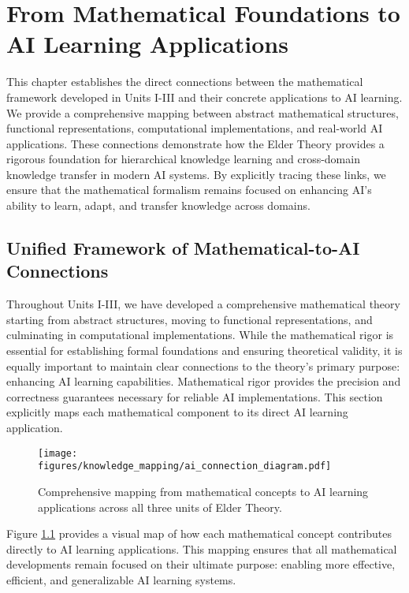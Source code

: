 \chapter{From Mathematical Foundations to AI Learning Applications}

\begin{tcolorbox}[colback=blue!5!white,colframe=blue!75!black,title=\textit{Chapter Summary}]
This chapter establishes the direct connections between the mathematical framework developed in Units I-III and their concrete applications to AI learning. We provide a comprehensive mapping between abstract mathematical structures, functional representations, computational implementations, and real-world AI applications. These connections demonstrate how the Elder Theory provides a rigorous foundation for hierarchical knowledge learning and cross-domain knowledge transfer in modern AI systems. By explicitly tracing these links, we ensure that the mathematical formalism remains focused on enhancing AI's ability to learn, adapt, and transfer knowledge across domains.
\end{tcolorbox}

\section{Unified Framework of Mathematical-to-AI Connections}

Throughout Units I-III, we have developed a comprehensive mathematical theory starting from abstract structures, moving to functional representations, and culminating in computational implementations. While the mathematical rigor is essential for establishing formal foundations and ensuring theoretical validity, it is equally important to maintain clear connections to the theory's primary purpose: enhancing AI learning capabilities. Mathematical rigor provides the precision and correctness guarantees necessary for reliable AI implementations. This section explicitly maps each mathematical component to its direct AI learning application.

\begin{figure}[h]
\centering
\texttt{[image: figures/knowledge\_mapping/ai\_connection\_diagram.pdf]}
\caption{Comprehensive mapping from mathematical concepts to AI learning applications across all three units of Elder Theory.}
\label{fig:ai_connection_diagram}
\end{figure}

Figure \ref{fig:ai_connection_diagram} provides a visual map of how each mathematical concept contributes directly to AI learning applications. This mapping ensures that all mathematical developments remain focused on their ultimate purpose: enabling more effective, efficient, and generalizable AI learning systems.

